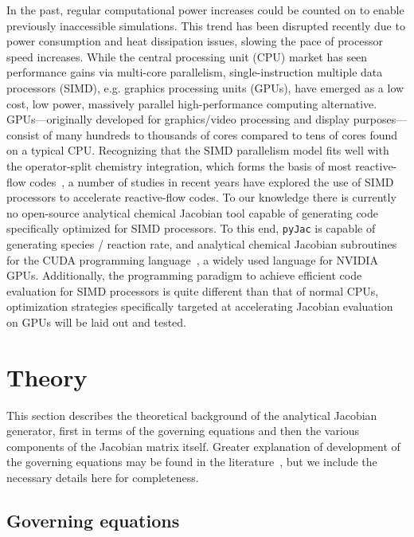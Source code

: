 \documentclass[preprint,12pt]{elsarticle}
\begin{document}
In the past, regular computational power increases could be counted on to enable previously inaccessible simulations.  
This trend has been disrupted recently due to power consumption and heat dissipation issues, slowing the pace of processor speed increases.
While the central processing unit (CPU) market has seen performance gains via multi-core parallelism, single-instruction multiple data processors (SIMD), e.g. graphics processing units (GPUs),  have emerged as a low cost, low power, massively parallel high-performance computing alternative. 
GPUs---originally developed for graphics/video processing and display purposes---consist of many hundreds to thousands of cores compared to tens of cores found on a typical CPU.
Recognizing that the SIMD parallelism model fits well with the operator-split chemistry integration, which forms the basis of most reactive-flow codes~\cite{oran2005numerical}, a number of studies in recent years \cite{niemeyer_accelerating_2014,niemeyer_turbulence-chemistry_2011,shi_accelerating_2012,shi_redesigning_2011,spafford_accelerating_2010,stone_techniques_2013} have explored the use of SIMD processors to accelerate reactive-flow codes.
To our knowledge there is currently no open-source analytical chemical Jacobian tool capable of generating code specifically optimized for SIMD processors.
To this end, \texttt{pyJac} is capable of generating species / reaction rate, and analytical chemical Jacobian subroutines for the CUDA programming language~\cite{Nickolls:2008:SPP:1365490.1365500}, a widely used language for NVIDIA GPUs.
Additionally, the programming paradigm to achieve efficient code evaluation for SIMD processors is quite different than that of normal CPUs, optimization strategies specifically targeted at accelerating Jacobian evaluation on GPUs will be laid out and tested.


\section{Theory}

This section describes the theoretical background of the analytical Jacobian generator, first in terms of the governing equations and then the various components of the Jacobian matrix itself.
Greater explanation of development of the governing equations may be found in the literature~\cite{Law:2006tu,Warnatz:2006tq,Glassman:2008tq}, but we include the necessary details here for completeness.

\subsection{Governing equations}
\label{sec:goveq}
\end{document}
